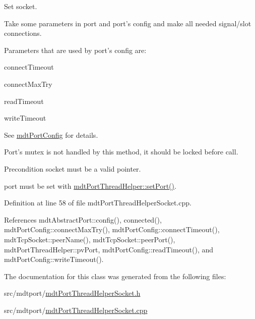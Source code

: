 Set socket. 

Take some parameters in port and port's config and make all needed signal/slot connections.

Parameters that are used by port's config are\-:
\begin{DoxyItemize}
\item connect\-Timeout
\item connect\-Max\-Try
\item read\-Timeout
\item write\-Timeout
\end{DoxyItemize}

See \hyperlink{classmdt_port_config}{mdt\-Port\-Config} for details.

Port's mutex is not handled by this method, it should be locked before call.

\begin{DoxyPrecond}{Precondition}
socket must be a valid pointer. 

port must be set with \hyperlink{classmdt_port_thread_helper_a4127c0b28dc63df06b5a36a4be8b3bb7}{mdt\-Port\-Thread\-Helper\-::set\-Port()}. 
\end{DoxyPrecond}


Definition at line 58 of file mdt\-Port\-Thread\-Helper\-Socket.\-cpp.



References mdt\-Abstract\-Port\-::config(), connected(), mdt\-Port\-Config\-::connect\-Max\-Try(), mdt\-Port\-Config\-::connect\-Timeout(), mdt\-Tcp\-Socket\-::peer\-Name(), mdt\-Tcp\-Socket\-::peer\-Port(), mdt\-Port\-Thread\-Helper\-::pv\-Port, mdt\-Port\-Config\-::read\-Timeout(), and mdt\-Port\-Config\-::write\-Timeout().



The documentation for this class was generated from the following files\-:\begin{DoxyCompactItemize}
\item 
src/mdtport/\hyperlink{mdt_port_thread_helper_socket_8h}{mdt\-Port\-Thread\-Helper\-Socket.\-h}\item 
src/mdtport/\hyperlink{mdt_port_thread_helper_socket_8cpp}{mdt\-Port\-Thread\-Helper\-Socket.\-cpp}\end{DoxyCompactItemize}
